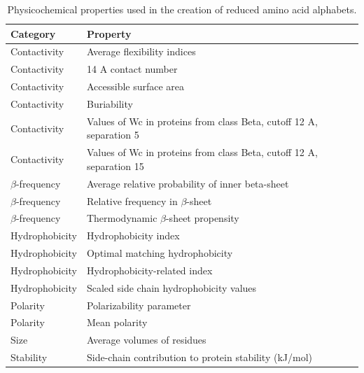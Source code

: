\documentclass{bioinfo}
\begin{document}
\begin{methods}
\begin{table}[bth]
\centering
\begin{tabular}{ll}
  \hline
Category & Property \\ 
  \hline
  Contactivity & Average flexibility indices \citep{bhaskaran_positional_1988} \\ 
  Contactivity & 14 A contact number \citep{nishikawa_radial_1986} \\ 
  Contactivity & Accessible surface area \citep{radzicka_comparing_1988} \\ 
    Contactivity & Buriability \citep{zhou_quantifying_2004} \\ 
  Contactivity & Values of Wc in proteins from class Beta, cutoff 12 A, separation 5 \citep{wozniak_characteristics_2014} \\ 
  Contactivity & Values of Wc in proteins from class Beta, cutoff 12 A, separation 15 \citep{wozniak_characteristics_2014} \\ 
  $\beta$-frequency & Average relative probability of inner beta-sheet \citep{kanehisa_local_1980} \\ 
  $\beta$-frequency & Relative frequency in $\beta$-sheet 
\citep{prabhakaran_distribution_1990} \\ 
  $\beta$-frequency & Thermodynamic $\beta$-sheet propensity 
\citep{kim_thermodynamic_1993} \\ 
  Hydrophobicity & Hydrophobicity index \citep{argos_structural_1982} \\ 
  Hydrophobicity & Optimal matching hydrophobicity \citep{sweet_correlation_1983} \\ 
  Hydrophobicity & Hydrophobicity-related index \citep{kidera_statistical_1985} \\ 
  Hydrophobicity & Scaled side chain hydrophobicity values \citep{black_development_1991} \\ 
  Polarity & Polarizability parameter \citep{charton_structural_1982} \\ 
  Polarity & Mean polarity \citep{radzicka_comparing_1988} \\ 
  Size & Average volumes of residues \citep{pontius_deviations_1996} \\ 
  Stability & Side-chain contribution to protein stability (kJ/mol) \citep{takano_new_2001} \\ 
   \hline
\end{tabular}
\caption{Physicochemical properties used in the creation of reduced amino acid alphabets.} 
\end{table}


\end{methods}
\end{document}
